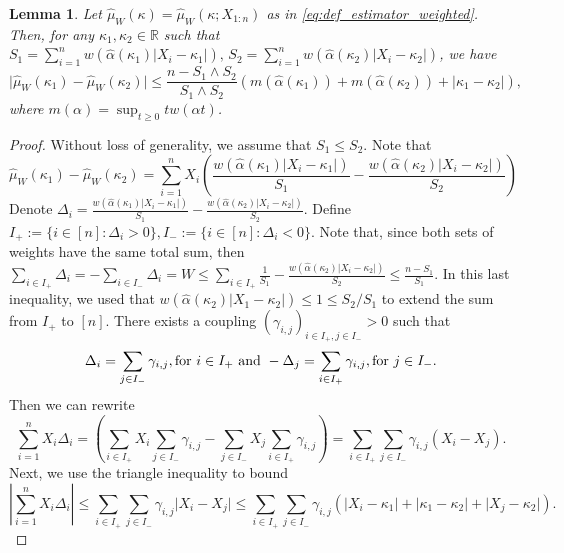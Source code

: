 \documentclass{article}
\theoremstyle{plain}
\newtheorem{lemma}[theorem]{Lemma}
\theoremstyle{definition}
\def\R{\mathbb{R}} %
\begin{document}
\begin{appendix}
\begin{lemma}\label{lemma:base_estimator_error_unbalanced}
  Let \( \widehat{\mu }_W(\kappa )= \widehat{\mu }_W(\kappa;X_{1:n} )  \) as in \eqref{eq:def_estimator_weighted}. Then, for any \( \kappa _1, \kappa _2 \in \R  \) such that \( S_1=\sum_{i=1}^n w(\widehat{\alpha }(\kappa _1) \lvert X_i -\kappa_1 \rvert  ),\, S_2=\sum_{i=1}^n w(\widehat{\alpha }(\kappa _2) \lvert X_i -\kappa_2 \rvert  ) \), we have
  \[
    \lvert \widehat{\mu }_W(\kappa _1) -\widehat{\mu }_W(\kappa _2)  \rvert  \le \frac{n-S_1 \wedge S_2}{S_1 \wedge S_2}(m(\widehat{\alpha }(\kappa _1) ) + m(\widehat{\alpha }(\kappa _2) )+ \lvert \kappa_1 -\kappa_2 \rvert ),
  \] 
  where \( m(\alpha )=\sup_{t \ge 0} t w(\alpha t) \). 
\end{lemma}
\begin{proof}
Without loss of generality, we assume that \( S_1 \le S_2 \). Note that \[
  \widehat{\mu }_W(\kappa_1)-\widehat{\mu }_W(\kappa _2)=  \sum_{i=1}^n X_i\left(\frac{w(\widehat{\alpha }(\kappa _1) \lvert X_i -\kappa _1 \rvert  )}{S_1} -  \frac{w(\widehat{\alpha }(\kappa _2) \lvert X_i -\kappa _2 \rvert  )}{S_2} \right)
  \] Denote \( \Delta_i = \frac{w(\widehat{\alpha }(\kappa_1) \lvert X_i -\kappa_1  \rvert )}{S_1}-\frac{w(\widehat{\alpha }(\kappa_2)  \lvert  X_i -\kappa _2 \rvert )}{S_2} \). Define \( I_+:=\{i \in [n]: \Delta_i > 0\}, I_-:= \{i \in [n]: \Delta_i < 0\}   \). Note that, since both sets of weights have the same total sum, then \( \sum_{i \in I_+}\Delta_i=-\sum_{i \in I_-}\Delta_i  = W \le \sum_{i\in I_+} \frac{1}{S_1} - \frac{w(\widehat{\alpha }(\kappa_2) \lvert X_i -\kappa_2 \rvert  )}{S_2} \le  \frac{n-S_1}{S_1} \). In this last inequality, we used that \( w(\widehat{\alpha }(\kappa _2) \lvert X_1-\kappa _2 \rvert  ) \le  1 \le S_2 / S_1 \) to extend the sum from \( I_+ \) to \( [n] \). There exists a coupling \( (\gamma_{i,j})_{i \in I_+, j \in I_-}>0 \) such that \[
\Delta_i = \sum_{j \in I_-} \gamma_{i,j}, \text{for \( i\in I_+ \) and } -\Delta_j = \sum_{i \in I_+} \gamma_{i,j}, \text{for \( j\in I_- \)}.
\] 
Then we can rewrite \[
  \sum_{i=1}^n X_i \Delta_i = \left( \sum_{i \in I_+} X_i \sum_{j \in I_-} \gamma_{i,j} - \sum_{j \in I_-} X_j \sum_{i \in I_+} \gamma_{i,j}  \right) = \sum_{i \in I_+}\sum_{j \in I_-} \gamma_{i,j}(X_i -X_j).
\] 
Next, we use the triangle inequality to bound \begin{equation}\label{eq:decomposition_unbalanced}
  \left\lvert \sum_{i=1}^n X_i \Delta_i \right\rvert \le \sum_{i \in I_+}\sum_{j \in I_-} \gamma_{i,j} \lvert X_i -X_j \rvert \le \sum_{i \in I_+}\sum_{j \in I_-} \gamma_{i,j}(\lvert X_i -\kappa_1 \rvert + \lvert \kappa_1 -\kappa_2 \rvert + \lvert X_j -\kappa_2 \rvert ).

\end{equation}
\end{proof}
\end{appendix}
\end{document}
